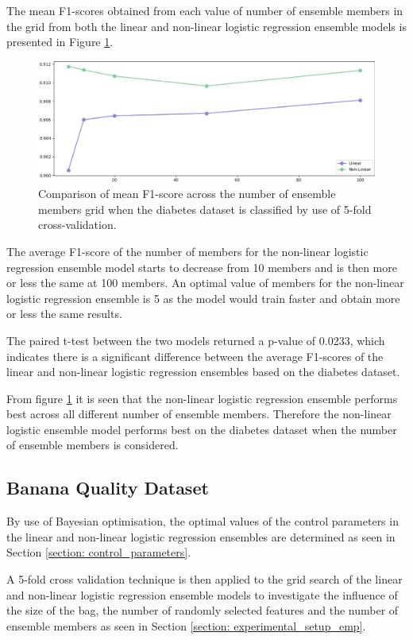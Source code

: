 \documentclass[10pt, conference]{IEEEtran}
\begin{document}
The mean F1-scores obtained from each value of number of ensemble members in the grid from both the linear and non-linear
logistic regression ensemble models is presented in Figure \ref{fig:D_member_comparison}.
\begin{figure}[H]
    \centerline{\includegraphics[scale=0.26]{../Images/D_members.PNG}}
    \caption{Comparison of mean F1-score across the number of ensemble members grid when the diabetes dataset is classified by use of 5-fold cross-validation.}
    \label{fig:D_member_comparison}
\end{figure}
The average F1-score of the number of members for the non-linear logistic regression ensemble model starts
to decrease from 10 members and is then more or less the same at 100 members. An optimal value of members for the
non-linear logistic regression ensemble is 5 as the model would train faster and obtain more or less the same results.

The paired t-test between the two models returned a p-value of 0.0233, which indicates there is a significant difference
between the average F1-scores of the linear and non-linear logistic regression ensembles based on the diabetes dataset.

From figure \ref{fig:D_member_comparison} it is seen that the non-linear logistic regression ensemble performs best across
all different number of ensemble members. Therefore the non-linear logistic ensemble model performs best on the diabetes dataset when the
number of ensemble members is considered.

\subsection{Banana Quality Dataset}

By use of Bayesian optimisation, the optimal values of the control parameters in the
linear and non-linear logistic regression ensembles are determined as seen in
Section \ref{section: control_parameters}.

A 5-fold cross validation technique is then applied to the grid search of the linear and non-linear logistic regression ensemble models
to investigate the influence of the size of the bag, the number of randomly selected features and
the number of ensemble members as seen in Section \ref{section: experimental_setup_emp}.
\end{document}
